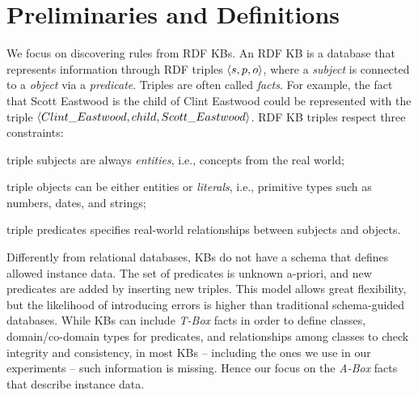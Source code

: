 \section{Preliminaries and Definitions} \label{sec:krd_prel}
We focus on discovering rules from RDF KBs. An RDF KB is
a database that represents information through RDF triples $\langle s,p,o\rangle$, where a \emph{subject} is connected to a \emph{object} via a \emph{predicate}. Triples are often called \emph{facts}. For example, the fact that Scott Eastwood is the child of Clint Eastwood could be represented with the triple $\langle Clint\_Eastwood,child,Scott\_Eastwood\rangle$. 
RDF KB triples respect three constraints:
\begin{inparaenum}[(i)]
	\item triple subjects are always \emph{entities}, i.e., concepts from the real world;
	\item triple objects can be either entities or \emph{literals}, i.e.,  primitive types such as numbers, dates, and strings;
	\item triple predicates specifies real-world relationships between subjects and objects.
\end{inparaenum}

Differently from relational databases, KBs do not have a schema that defines allowed instance data. 
The set of predicates is unknown a-priori, and new predicates are added by inserting new triples. %
This model allows great flexibility, but the likelihood of introducing errors is higher than traditional schema-guided databases.
While KBs can include \emph{T-Box} facts in order to define classes, domain/co-domain types for predicates, and relationships among classes
to check integrity and consistency, in most KBs -- including the ones we use in our experiments -- such information is missing. %
Hence our focus on the \emph{A-Box} facts that describe instance data. 

